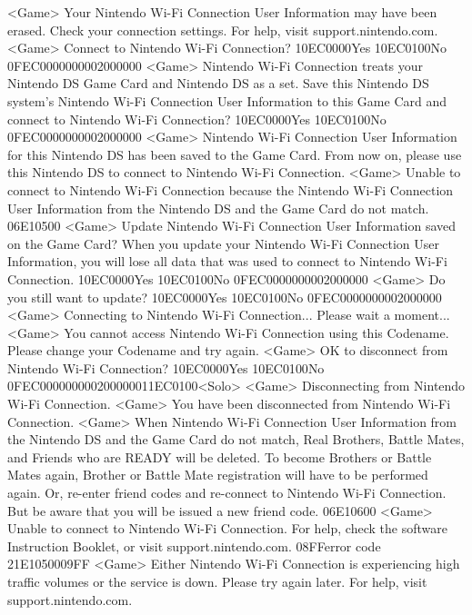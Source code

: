 <Game> Your Nintendo Wi-Fi Connection User Information may have been erased. 
Check your connection settings. For help, visit support.nintendo.com. 
<Game> Connect to Nintendo Wi-Fi Connection? {10}{EC}{00}{00}Yes {10}{EC}{01}{00}No {0F}{EC}{00}{00}{00}{00}{02}{00}{00}{00}
<Game> Nintendo Wi-Fi Connection treats your Nintendo DS Game Card and Nintendo DS 
as a set. Save this Nintendo DS system's Nintendo Wi-Fi Connection User Information 
to this Game Card and connect to Nintendo Wi-Fi Connection? {10}{EC}{00}{00}Yes {10}{EC}{01}{00}No {0F}{EC}{00}{00}{00}{00}{02}{00}{00}{00}
<Game> Nintendo Wi-Fi Connection User Information for this 
Nintendo DS has been saved to the Game Card. 
From now on, please use this Nintendo DS to connect to Nintendo Wi-Fi Connection. 
<Game> Unable to connect to Nintendo Wi-Fi Connection 
because the Nintendo Wi-Fi Connection User Information 
from the Nintendo DS and the Game Card do not match. 
{06}{E1}{05}{00}
<Game> Update Nintendo Wi-Fi Connection User Information saved on the Game Card? 
When you update your Nintendo Wi-Fi Connection User Information, you will 
lose all data that was used to connect to Nintendo Wi-Fi Connection. {10}{EC}{00}{00}Yes {10}{EC}{01}{00}No {0F}{EC}{00}{00}{00}{00}{02}{00}{00}{00}
<Game> Do you still want to update? {10}{EC}{00}{00}Yes {10}{EC}{01}{00}No {0F}{EC}{00}{00}{00}{00}{02}{00}{00}{00}
<Game> Connecting to Nintendo Wi-Fi Connection... Please wait a moment...
<Game> You cannot access Nintendo Wi-Fi Connection 
using this Codename. Please change your Codename and try again. 
<Game> OK to disconnect from Nintendo Wi-Fi Connection? {10}{EC}{00}{00}Yes {10}{EC}{01}{00}No {0F}{EC}{00}{00}{00}{00}{02}{00}{00}{00}{11}{EC}{01}{00}<Solo>
<Game> Disconnecting from Nintendo Wi-Fi Connection.
<Game> You have been disconnected from Nintendo Wi-Fi Connection. 
<Game> When Nintendo Wi-Fi Connection User Information from the Nintendo DS 
and the Game Card do not match, 
Real Brothers, Battle Mates, and Friends who are READY will be deleted. 
To become Brothers or Battle Mates again, 
Brother or Battle Mate registration will have to be performed again. 
Or, re-enter friend codes and re-connect to Nintendo Wi-Fi Connection. 
But be aware that you will be issued a new friend code. 
{06}{E1}{06}{00}
<Game> Unable to connect to Nintendo Wi-Fi Connection. For help, check the software 
Instruction Booklet, or visit support.nintendo.com. 
{08}{FF}error code {21}{E1}{05}{00}{09}{FF} 
<Game> Either Nintendo Wi-Fi Connection is experiencing high traffic volumes or the 
service is down. Please try again later. 
For help, visit support.nintendo.com. 
